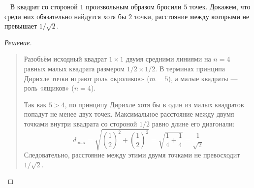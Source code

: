 \begin{example} ~
    В квадрат со стороной $1$ произвольным образом бросили $5$ точек. 
    Докажем, что среди них обязательно найдутся хотя бы $2$ точки, 
    расстояние между которыми не превышает $1/\sqrt{2}$.

    \begin{proof}[Решение]~\\
        \begin{quote}
            Разобьём исходный квадрат $1 \times 1$ двумя средними линиями на 
            $n = 4$ равных малых квадрата размером $1/2 \times 1/2$. 
            В терминах принципа Дирихле точки играют роль «кроликов» 
            ($m = 5$), а малые квадраты --- роль «ящиков» ($n = 4$).

            Так как $5 > 4$, по принципу Дирихле хотя бы в один из малых 
            квадратов попадут не менее двух точек. Максимальное расстояние 
            между двумя точками внутри квадрата со стороной $1/2$ равно 
            длине его диагонали:
            \[
                d_{\max} = \sqrt{\left(\frac{1}{2}\right)^2 + 
                \left(\frac{1}{2}\right)^2} = 
                \sqrt{\frac{1}{4} + \frac{1}{4}} = \frac{1}{\sqrt{2}}
            \]
            Следовательно, расстояние между этими двумя точками не 
            превосходит $1/\sqrt{2}$.
        \end{quote}
    \end{proof}

    \begin{figure}[H]
        \centering
\end{figure}
\end{example}
